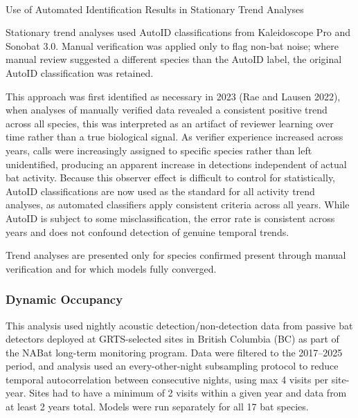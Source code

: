 \documentclass[
  letterpaper,
  DIV=11,
  numbers=noendperiod]{scrartcl}
\makeatletter
\let\oldparagraph\paragraph
\renewcommand{\paragraph}{
    \@ifstar
      \xxxParagraphStar
      \xxxParagraphNoStar
  }
\newcommand{\xxxParagraphStar}[1]{\oldparagraph*{#1}\mbox{}}
\newcommand{\xxxParagraphNoStar}[1]{\oldparagraph{#1}\mbox{}}
\makeatother
\begin{document}
\paragraph{Use of Automated Identification Results in Stationary Trend
Analyses}\label{use-of-automated-identification-results-in-stationary-trend-analyses}

Stationary trend analyses used AutoID classifications from Kaleidoscope
Pro and Sonobat 3.0. Manual verification was applied only to flag
non-bat noise; where manual review suggested a different species than
the AutoID label, the original AutoID classification was retained.

This approach was first identified as necessary in 2023 (Rae and Lausen
2022), when analyses of manually verified data revealed a consistent
positive trend across all species, this was interpreted as an artifact
of reviewer learning over time rather than a true biological signal. As
verifier experience increased across years, calls were increasingly
assigned to specific species rather than left unidentified, producing an
apparent increase in detections independent of actual bat activity.
Because this observer effect is difficult to control for statistically,
AutoID classifications are now used as the standard for all activity
trend analyses, as automated classifiers apply consistent criteria
across all years. While AutoID is subject to some misclassification, the
error rate is consistent across years and does not confound detection of
genuine temporal trends.

Trend analyses are presented only for species confirmed present through
manual verification and for which models fully converged.

\subsubsection{Dynamic Occupancy}\label{dynamic-occupancy}

This analysis used nightly acoustic detection/non-detection data from
passive bat detectors deployed at GRTS-selected sites in British
Columbia (BC) as part of the NABat long-term monitoring program. Data
were filtered to the 2017--2025 period, and analysis used an
every-other-night subsampling protocol to reduce temporal
autocorrelation between consecutive nights, using max 4 visits per
site-year. Sites had to have a minimum of 2 visits within a given year
and data from at least 2 years total. Models were run separately for all
17 bat species.
\end{document}
